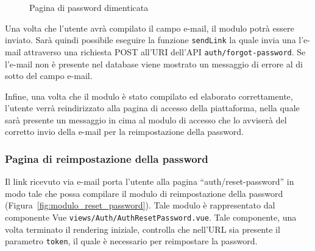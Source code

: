 \begin{figure}[htbp]
	\centering
	\fboxsep=0.5pt
	\fboxrule=0.5pt
	\caption{Pagina di password dimenticata}
	\label{fig:modulo_reimpostazione_password}
\end{figure}

Una volta che l'utente avr\`a compilato il campo e-mail, il modulo potr\`a essere inviato. Sar\`a quindi possibile eseguire la funzione \verb|sendLink| la quale invia una l'e-mail attraverso una richiesta POST all'URI dell'API \verb|auth/forgot-password|. Se l'e-mail non \`e presente nel database viene mostrato un messaggio di errore al di sotto del campo e-mail.

Infine, una volta che il modulo \`e stato compilato ed elaborato correttamente, l'utente verr\`a reindirizzato alla pagina di accesso della piattaforma, nella quale sar\`a presente un messaggio in cima al modulo di accesso che lo avviser\`a del corretto invio della e-mail per la reimpostazione della password.


\subsubsection{Pagina di reimpostazione della password}
Il link ricevuto via e-mail porta l'utente alla pagina ``auth/reset-password'' in modo tale che possa compilare il modulo di reimpostazione della password  (Figura~\ref{fig:modulo_reset_password}).  Tale modulo \`e rappresentato dal componente Vue \verb|views/Auth/AuthResetPassword.vue|. Tale componente, una volta terminato il rendering iniziale, controlla che nell'URL sia presente il parametro \verb|token|, il quale \`e necessario per reimpostare la password.

